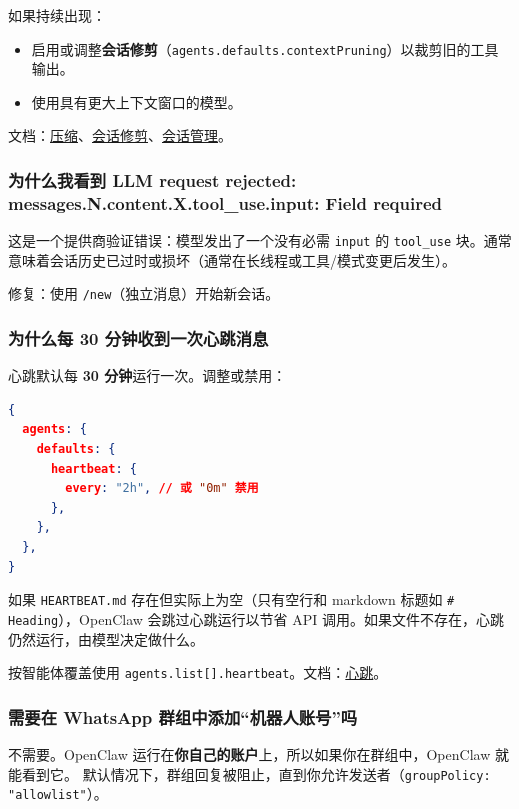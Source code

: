 如果持续出现：

\begin{itemize}
  \item 启用或调整\textbf{会话修剪}（\texttt{agents.defaults.contextPruning}）以裁剪旧的工具输出。
  \item 使用具有更大上下文窗口的模型。
\end{itemize}


文档：\href{/concepts/compaction}{压缩}、\href{/concepts/session-pruning}{会话修剪}、\href{/concepts/session}{会话管理}。

\subsubsection{为什么我看到 LLM request rejected: messages.N.content.X.tool\_use.input: Field required}


这是一个提供商验证错误：模型发出了一个没有必需 \texttt{input} 的 \texttt{tool\_use} 块。通常意味着会话历史已过时或损坏（通常在长线程或工具/模式变更后发生）。

修复：使用 \texttt{/new}（独立消息）开始新会话。

\subsubsection{为什么每 30 分钟收到一次心跳消息}


心跳默认每 \textbf{30 分钟}运行一次。调整或禁用：

\begin{lstlisting}[language=json]
{
  agents: {
    defaults: {
      heartbeat: {
        every: "2h", // 或 "0m" 禁用
      },
    },
  },
}
\end{lstlisting}


如果 \texttt{HEARTBEAT.md} 存在但实际上为空（只有空行和 markdown 标题如 \texttt{\# Heading}），OpenClaw 会跳过心跳运行以节省 API 调用。如果文件不存在，心跳仍然运行，由模型决定做什么。

按智能体覆盖使用 \texttt{agents.list[].heartbeat}。文档：\href{/gateway/heartbeat}{心跳}。

\subsubsection{需要在 WhatsApp 群组中添加“机器人账号”吗}


不需要。OpenClaw 运行在\textbf{你自己的账户}上，所以如果你在群组中，OpenClaw 就能看到它。
默认情况下，群组回复被阻止，直到你允许发送者（\texttt{groupPolicy: "allowlist"}）。

